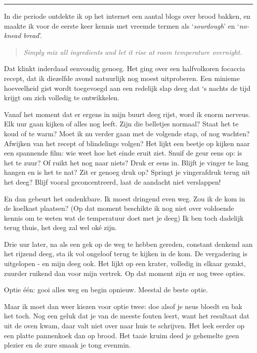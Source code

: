 \documentclass[
  11pt,
  dutch,
]{memoir}
\begin{document}
\pfbreak

In die periode ontdekte ik op het internet een aantal blogs over brood
bakken, en maakte ik voor de eerste keer kennis met vreemde termen als
`\emph{sourdough}' en `\emph{no-knead bread}'.

\begin{quote}
\emph{Simply mix all ingredients and let it rise at room temperature
overnight.}
\end{quote}

Dat klinkt inderdaad eenvoudig genoeg. Het ging over een halfvolkoren
focaccia recept, dat ik diezelfde avond natuurlijk nog moest
uitproberen. Een minieme hoeveelheid gist wordt toegevoegd aan een
redelijk slap deeg dat `s nachts de tijd krijgt om zich volledig te
ontwikkelen.

Vanaf het moment dat er ergens in mijn buurt deeg rijst, word ik enorm
nerveus. Elk uur gaan kijken of alles nog leeft. Zijn die belletjes
normaal? Staat het te koud of te warm? Moet ik nu verder gaan met de
volgende stap, of nog wachten? Afwijken van het recept of blindelings
volgen? Het lijkt een beetje op kijken naar een spannende film: wie weet
hoe het einde eruit ziet. Snuif de geur eens op: is het te zuur? Of
ruikt het nog naar niets? Druk er eens in. Blijft je vinger te lang
hangen en is het te nat? Zit er genoeg druk op? Springt je vingerafdruk
terug uit het deeg? Blijf vooral geconcentreerd, laat de aandacht niet
verslappen!

En dan gebeurt het ondenkbare. Ik moest dringend even weg. Zou ik de kom
in de koelkast plaatsen? (Op dat moment beschikte ik nog niet over
voldoende kennis om te weten wat de temperatuur doet met je deeg) Ik ben
toch dadelijk terug thuis, het deeg zal wel oké zijn.

Drie uur later, na als een gek op de weg te hebben gereden, constant
denkend aan het rijzend deeg, sta ik vol ongeloof terug te kijken in de
kom. De vergadering is uitgelopen - en mijn deeg ook. Het lijkt op een
krater, volledig in elkaar gezakt, zuurder ruikend dan voor mijn
vertrek. Op dat moment zijn er nog twee opties.

Optie één: gooi alles weg en begin opnieuw. Meestal de beste optie.

Maar ik moet dan weer kiezen voor optie twee: doe alsof je neus bloedt
en bak het toch. Nog een geluk dat je van de meeste fouten leert, want
het resultaat dat uit de oven kwam, daar valt niet over naar huis te
schrijven. Het leek eerder op een platte pannenkoek dan op brood. Het
taaie kruim deed je gehemelte geen plezier en de zure smaak je tong
evenmin.
\end{document}
